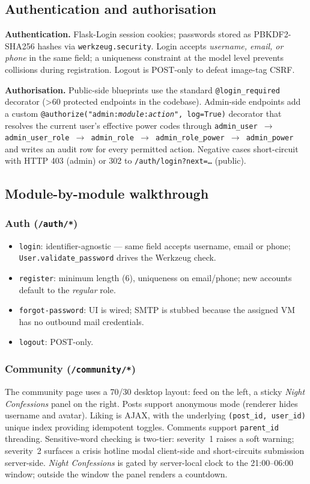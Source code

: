 \subsection{Authentication and authorisation}
\textbf{Authentication.} Flask-Login session cookies; passwords stored as
PBKDF2-SHA256 hashes via \texttt{werkzeug.security}. Login accepts
\emph{username, email, or phone} in the same field; a uniqueness
constraint at the model level prevents collisions during registration.
Logout is POST-only to defeat image-tag CSRF.

\textbf{Authorisation.} Public-side blueprints use the standard
\texttt{@login\_required} decorator (\textgreater 60 protected endpoints
in the codebase). Admin-side endpoints add a custom
\texttt{@authorize("admin:\textit{module}:\textit{action}", log=True)}
decorator that resolves the current user's effective power codes through
\texttt{admin\_user $\to$ admin\_user\_role $\to$ admin\_role $\to$
admin\_role\_power $\to$ admin\_power} and writes an audit row for every
permitted action. Negative cases short-circuit with HTTP 403 (admin) or
302 to \texttt{/auth/login?next=…} (public).

\subsection{Module-by-module walkthrough}

\subsubsection{Auth (\texttt{/auth/*})}
\begin{itemize}
  \item \texttt{login}: identifier-agnostic — same field accepts username,
        email or phone; \texttt{User.validate\_password} drives the
        Werkzeug check.
  \item \texttt{register}: minimum length (6), uniqueness on email/phone;
        new accounts default to the \emph{regular} role.
  \item \texttt{forgot-password}: UI is wired; SMTP is stubbed because
        the assigned VM has no outbound mail credentials.
  \item \texttt{logout}: POST-only.
\end{itemize}

\subsubsection{Community (\texttt{/community/*})}
The community page uses a 70/30 desktop layout: feed on the left, a
sticky \emph{Night Confessions} panel on the right. Posts support
anonymous mode (renderer hides username and avatar). Liking is AJAX, with
the underlying \texttt{(post\_id, user\_id)} unique index providing
idempotent toggles. Comments support \texttt{parent\_id} threading.
Sensitive-word checking is two-tier: severity~1 raises a soft warning;
severity~2 surfaces a crisis hotline modal client-side and short-circuits
submission server-side. \emph{Night Confessions} is gated by server-local
clock to the 21:00–06:00 window; outside the window the panel renders a
countdown.

